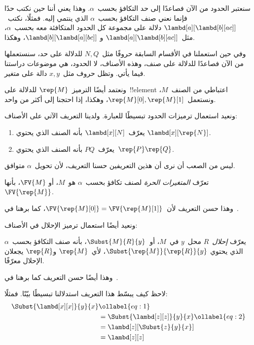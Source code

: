 \documentclass[../../../include/open-logic-section]{subfiles}
\begin{document}

سنعتبر الحدود من الآن فصاعدًا إلى حد التكافؤ بحسب~$\alpha$. وهذا يعني
أننا حين نكتب حدًا فإنما نعني صنف التكافؤ بحسب~$\alpha$ الذي ينتمي إليه.
فمثلًا، نكتب~$\lambd[a][\lambd[b][a c]]$ دلالة على مجموعة كل الحدود
المتكافئة معه بحسب~$\alpha$، مثل~$\lambd[a][\lambd[b][a c]]$ و
$\lambd[b][\lambd[a][b c]]$، وهكذا.

وفي حين استعملنا في الأقسام السابقة حروفًا مثل~$N, Q$ للدلالة على حد،
سنستعملها من الآن فصاعدًا للدلالة على صنف، وهذه الأصناف، لا الحدود، هي
موضوعات دراستنا فيما يأتي. وتظل حروف مثل~$x, y$ دالة على متغير.

ونعتمد أيضًا الترميز~$\rep{M}$ للدلالة على~!!{element} اعتباطي من
الصنف~$M$، ونستعمل~$\rep{M}[0], \rep{M}[1]$، وهكذا، إذا احتجنا إلى
أكثر من واحد.

ونعيد استعمال ترميزات الحدود تبسيطًا للعبارة. ولدينا التعريف الآتي على
الأصناف:
\begin{defn}
  \begin{enumerate}
  \item يعرّف~$\lambd[x][N]$ بأنه الصنف الذي يحتوي
    $\lambd[x][\rep{N}]$.
  \item يعرّف~$PQ$ بأنه الصنف الذي يحتوي~$\rep{P}\rep{Q}$.
  \end{enumerate}
\end{defn}

ليس من الصعب أن نرى أن هذين التعريفين حسنا التعريف، لأن تحويل~$\alpha$
متوافق.

\begin{defn} 
  تعرّف \emph{المتغيرات الحرة} لصنف تكافؤ بحسب~$\alpha$ هو~$M$، أو
  $\FV{M}$، بأنها~$\FV{\rep{M}}$.
\end{defn}

وهذا حسن التعريف لأن~$\FV{\rep{M}[0]} =
\FV{\rep{M}[1]}$، كما برهنا في~.

ونعيد أيضًا استعمال ترميز الإحلال في الأصناف:
\begin{defn} 
  يعرّف \emph{إحلال}~$R$ محل~$y$ في~$M$، أو~$\Subst{M}{R}{y}$، بأنه
  صنف التكافؤ بحسب~$\alpha$ الذي يحتوي
  $\Subst{\rep{M}}{\rep{R}}{y}$، لأي~$\rep{M}$ و$\rep{R}$ يجعلان
  الإحلال معرّفًا.
\end{defn}

وهذا أيضًا حسن التعريف كما برهنا في~.

لاحظ كيف يبسّط هذا التعريف استدلالنا تبسيطًا بيّنًا. فمثلًا:
\begin{align}
  \Subst{\lambd[x][x]}{y}{x} & \ollabel{eq:1}\\
  &= \Subst{\lambd[z][z]}{y}{x} \ollabel{eq:2}\\
  &= \lambd[z][\Subst{z}{y}{x}] \\
  &= \lambd[z][z]
\end{align}
\end{document}
